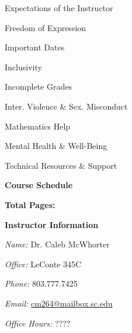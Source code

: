 \documentclass[11pt,letterpaper]{article}
\makeatletter
\newcommand{\instructor}{Dr. Caleb McWhorter}
\newcommand{\office}{LeConte 345C}
\newcommand{\phone}{803.777.7425}
\newcommand{\email}{cm264@mailbox.sc.edu}
\newcommand{\officehours}{????}
\makeatother
\begin{document}
\begin{minipage}[t]{0.45\textwidth}
\hspace{0.3cm} Expectations of the Instructor \dotfill \pageref{univ_instructorexp} \par
\hspace{0.3cm} Freedom of Expression \dotfill \pageref{univ_freedexpression} \par
\hspace{0.3cm} Important Dates \dotfill \pageref{univ_dates} \par
\hspace{0.3cm} Inclusivity \dotfill \pageref{univ_inclusion} \par
\hspace{0.3cm} Incomplete Grades \dotfill \pageref{univ_incomplete} \par
\hspace{0.3cm} Inter. Violence \& Sex. Misconduct \dotfill \pageref{univ_viosexmis} \par
\hspace{0.3cm} Mathematics Help \dotfill \pageref{univ_mathhelp} \par
\hspace{0.3cm} Mental Health \& Well-Being \dotfill \pageref{univ_mental} \par
\hspace{0.3cm} Technical Resources \& Support \dotfill \pageref{univ_techsupport} \par
{\bfseries\color{scred} Course Schedule} \dotfill \pageref{schd} \par
\hfill {\bfseries\color{scred} Total Pages:} \pageref*{LastPage}
\end{minipage}
\pvspace{0.6cm}




\vspace{-0.2cm}  \vspace{-0.4cm}


{\bfseries\color{scred} Instructor Information} \par
\textit{Name:} \instructor \par
\textit{Office:} \office \par
\textit{Phone:} \phone \par
\textit{Email:} \href{mailto:\email}{\email} \par
\textit{Office Hours:} \officehours 
\pvspace{0.2cm}
\end{document}
